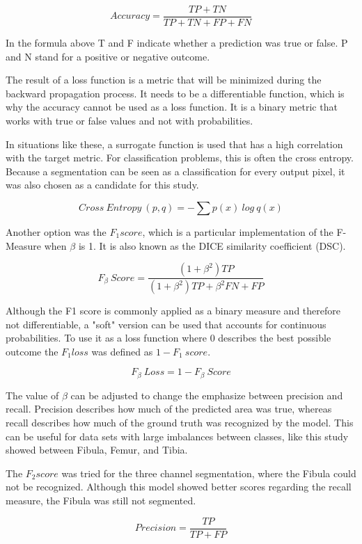 \[
Accuracy = \frac{TP+TN}{TP+TN+FP+FN}
\]

In the formula above T and F indicate whether a prediction was true or false. P and N stand for a positive or negative outcome.

The result of a loss function is a metric that will be minimized during the backward propagation process. It needs to be a differentiable function, which is why the accuracy cannot be used as a loss function. It is a binary metric that works with true or false values and not with probabilities.

In situations like these, a surrogate function is used that has a high correlation with the target metric. For classification problems, this is often the cross entropy. Because a segmentation can be seen as a classification for every output pixel, it was also chosen as a candidate for this study.

\[
Cross \ Entropy \ (p, q) = -\sum p(x) \ log \ q(x)
\]

Another option was the $F_1 score$, which is a particular implementation of the F-Measure when $ \beta $ is 1. It is also known as the DICE similarity coefficient (DSC).

\[
F_\beta \ Score= \frac{(1 + \beta^2) TP}{(1+\beta^2)TP+\beta^2FN+FP}
\]

Although the F1 score is commonly applied as a binary measure and therefore not differentiable, a "soft" version can be used that accounts for continuous probabilities. To use it as a loss function where 0 describes the best possible outcome the $F_1 loss$ was defined as $ 1 - F_1 \ score $.

\[
F_\beta \ Loss = 1 - F_\beta \ Score
\]

The value of $ \beta $ can be adjusted to change the emphasize between precision and recall. Precision describes how much of the predicted area was true, whereas recall describes how much of the ground truth was recognized by the model. This can be useful for data sets with large imbalances between classes, like this study showed between Fibula, Femur, and Tibia. 

The $F_2 score$ was tried for the three channel segmentation, where the Fibula could not be recognized. Although this model showed better scores regarding the recall measure, the Fibula was still not segmented.

\begin{equation}
Precision = \frac{TP}{TP+FP}
\end{equation}


